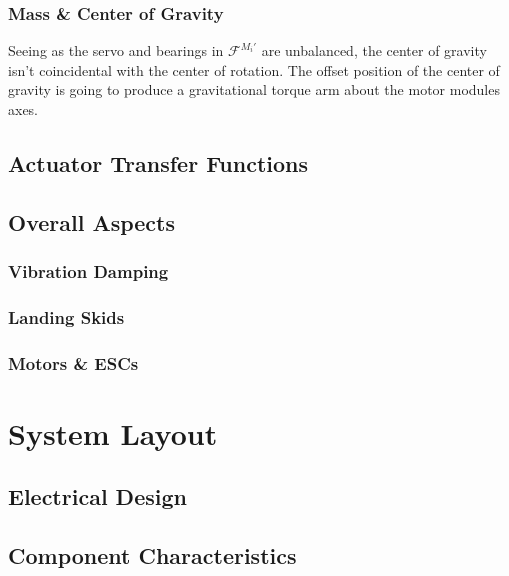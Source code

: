 \subsubsection*{Mass \& Center of Gravity}
Seeing as the servo and bearings in $\mathcal{F}^{M_i'}$ are unbalanced, the center of gravity isn't coincidental with the center of rotation. The offset position of the center of gravity is going to produce a gravitational torque arm about the motor modules axes.


\subsection{Actuator Transfer Functions}
\label{subsec:proto.design.transfer}

\subsection{Overall Aspects}
\label{subsec:proto.design.aspects}
\subsubsection{Vibration Damping}
\subsubsection{Landing Skids}
\subsubsection{Motors \& ESCs}

\section{System Layout}
\label{sec:proto.layout}
\subsection{Electrical Design}
\subsection{Component Characteristics}